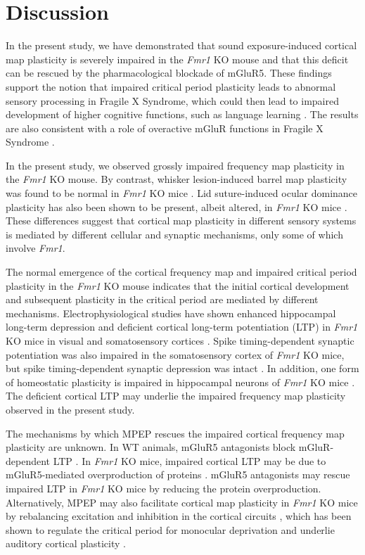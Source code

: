 \section{Discussion}

In the present study, we have demonstrated that sound exposure-induced cortical map plasticity is severely impaired in the \textit{Fmr1} KO mouse and that this deficit can be rescued by the pharmacological blockade of mGluR5. These findings support the notion that impaired critical period plasticity leads to abnormal sensory processing in Fragile X Syndrome, which could then lead to impaired development of higher cognitive functions, such as language learning \cite{Leblanc2011}. The results are also consistent with a role of overactive mGluR functions in Fragile X Syndrome \cite{Bear2004, Dolen2007}.

In the present study, we observed grossly impaired frequency map plasticity in the \textit{Fmr1} KO mouse. By contrast, whisker lesion-induced barrel map plasticity was found to be normal in \textit{Fmr1} KO mice \cite{Harlow2010a}. Lid suture-induced ocular dominance plasticity has also been shown to be present, albeit altered, in \textit{Fmr1} KO mice \cite{Dolen2007}. These differences suggest that cortical map plasticity in different sensory systems is mediated by different cellular and synaptic mechanisms, only some of which involve \textit{Fmr1}.

The normal emergence of the cortical frequency map and impaired critical period plasticity in the \textit{Fmr1} KO mouse indicates that the initial cortical development and subsequent plasticity in the critical period are mediated by different mechanisms. Electrophysiological studies have shown enhanced hippocampal long-term depression and deficient cortical long-term potentiation (LTP) in \textit{Fmr1} KO mice in visual and somatosensory cortices \cite{Li2002, Zhao2005, Wilson2007}. Spike timing-dependent synaptic potentiation was also impaired in the somatosensory cortex of \textit{Fmr1} KO mice, but spike timing-dependent synaptic depression was intact \cite{Desai2006, Meredith2007}. In addition, one form of homeostatic plasticity is impaired in hippocampal neurons of \textit{Fmr1} KO mice \cite{Soden2010}. The deficient cortical LTP may underlie the impaired frequency map plasticity observed in the present study.

The mechanisms by which MPEP rescues the impaired cortical frequency map plasticity are unknown. In WT animals, mGluR5 antagonists block mGluR-dependent LTP \cite{Wang2003, Wilson2007}. In \textit{Fmr1} KO mice, impaired cortical LTP may be due to mGluR5-mediated overproduction of proteins \cite{Dolen2007, Dolen2008}. mGluR5 antagonists may rescue impaired LTP in \textit{Fmr1} KO mice by reducing the protein overproduction. Alternatively, MPEP may also facilitate cortical map plasticity in \textit{Fmr1} KO mice by rebalancing excitation and inhibition in the cortical circuits \cite{Chuang2005, Selby2007, Curia2009}, which has been shown to regulate the critical period for monocular deprivation and underlie auditory cortical plasticity \cite{Hensch2004, Dorrn2010}.


